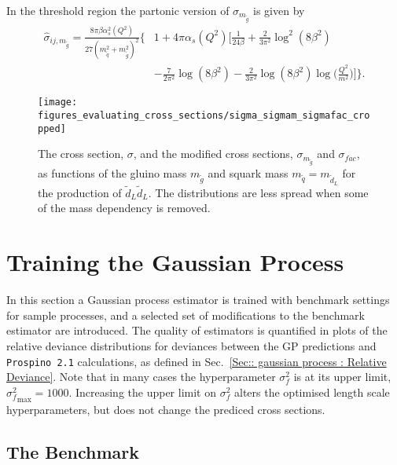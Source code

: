 \documentclass[twoside,english]{uiofysmaster}
\begin{document}
{{In the threshold region the partonic version of $\sigma_{m_{\widetilde{g}}}$ is given by
\begin{align}
\hat{\sigma}_{ij, m_{\widetilde{g}}} =  \frac{8 \pi \beta \alpha^2_s (Q^2)}{27(m_{\widetilde{q}}^2 + m_{\widetilde{g}}^2)^2} \Bigg\{&1 
 + 4 \pi \alpha_s (Q^2) \Bigg[ \frac{1}{24 \beta} 
 + \frac{2}{3 \pi^2} \log^2(8 \beta^2) \nonumber \\& - \frac{7}{2 \pi^2} \log (8 \beta^2)
- \frac{2}{3 \pi^2} \log (8 \beta^2) \log \Big( \frac{Q^2}{m^2} \Big) \Bigg] \Bigg\}.
\end{align}



\begin{figure}
\texttt{[image: figures\_evaluating\_cross\_sections/sigma\_sigmam\_sigmafac\_cropped]}
\caption{The cross section, $\sigma$, and the modified cross sections, $\sigma_{m_{\widetilde{g}}}$ and $\sigma_{fac}$,  as functions of the gluino mass $m_{\widetilde{g}}$ and squark mass $m_{\widetilde{q}} = m_{\widetilde{d}_L}$ for the production of $\widetilde{d}_L \widetilde{d}_L$. The distributions are less spread when some of the mass dependency is removed.}
\label{Fig:: evaluating cross : Comparison sigma and sigma/m}
\end{figure}

\section{Training the Gaussian Process}

In this section a Gaussian process estimator is trained with benchmark settings for sample processes, and a selected set of modifications to the benchmark estimator are introduced. The quality of estimators is quantified in plots of the relative deviance distributions for deviances between the GP predictions and \verb|Prospino 2.1| calculations, as defined in Sec.~\ref{Sec:: gaussian process : Relative Deviance}. Note that in many cases the hyperparameter $\sigma_f^2$ is at its upper limit, ${\sigma_f^2}_{\mathrm{max}} = 1000$. Increasing the upper limit on $\sigma_f^2$ alters the optimised length scale hyperparameters, but does not change the prediced cross sections. 

\subsection{The Benchmark}\label{Sec:: evaluating cross : The Benchmark}

}}
\end{document}
